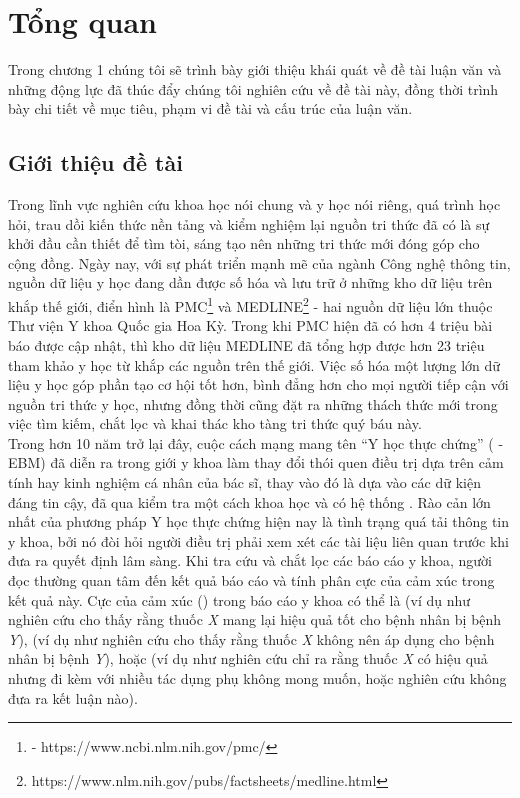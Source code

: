 \section{Tổng quan}
Trong chương 1 chúng tôi sẽ trình bày giới thiệu khái quát về đề tài luận văn và những động lực đã thúc đẩy chúng tôi nghiên cứu về đề tài này, đồng thời trình bày chi tiết về mục tiêu, phạm vi đề tài và cấu trúc của luận văn.
\subsection{Giới thiệu đề tài}
Trong lĩnh vực nghiên cứu khoa học nói chung và y học nói riêng, quá trình học hỏi, trau dồi kiến thức nền tảng và kiểm nghiệm lại nguồn tri thức đã có là sự khởi đầu cần thiết để tìm tòi, sáng tạo nên những tri thức mới đóng góp cho cộng đồng. Ngày nay, với sự phát triển mạnh mẽ của ngành Công nghệ thông tin, nguồn dữ liệu y học đang dần được số hóa và lưu trữ ở những kho dữ liệu trên khắp thế giới, điển hình là PMC\footnote{ - https://www.ncbi.nlm.nih.gov/pmc/} và MEDLINE\footnote{https://www.nlm.nih.gov/pubs/factsheets/medline.html} - hai nguồn dữ liệu lớn thuộc Thư viện Y khoa Quốc gia Hoa Kỳ. Trong khi PMC hiện đã có hơn 4 triệu bài báo được cập nhật, thì kho dữ liệu MEDLINE đã tổng hợp được hơn 23 triệu tham khảo y học từ khắp các nguồn trên thế giới. Việc số hóa một lượng lớn dữ liệu y học góp phần tạo cơ hội tốt hơn, bình đẳng hơn cho mọi người tiếp cận với nguồn tri thức y học, nhưng đồng thời cũng đặt ra những thách thức mới trong việc tìm kiếm, chắt lọc và khai thác kho tàng tri thức quý báu này.\\

Trong hơn 10 năm trở lại đây, cuộc cách mạng mang tên ``Y học thực chứng'' ( - EBM) đã diễn ra trong giới y khoa làm thay đổi thói quen điều trị dựa trên cảm tính hay kinh nghiệm cá nhân của bác sĩ, thay vào đó là dựa vào các dữ kiện đáng tin cậy, đã qua kiểm tra một cách khoa học và có hệ thống \cite{Nguyen2004}. Rào cản lớn nhất của phương pháp Y học thực chứng hiện nay là tình trạng quá tải thông tin y khoa, bởi nó đòi hỏi người điều trị phải xem xét các tài liệu liên quan trước khi đưa ra quyết định lâm sàng. Khi tra cứu và chắt lọc các báo cáo y khoa, người đọc thường quan tâm đến kết quả báo cáo và tính phân cực của cảm xúc trong kết quả này. Cực của cảm xúc () trong báo cáo y khoa có thể là \tichcuc (ví dụ như nghiên cứu cho thấy rằng thuốc \textit{X} mang lại hiệu quả tốt cho bệnh nhân bị bệnh \textit{Y}), \tieucuc (ví dụ như nghiên cứu cho thấy rằng thuốc \textit{X} không nên áp dụng cho bệnh nhân bị bệnh \textit{Y}), hoặc \trungtinh (ví dụ như nghiên cứu chỉ ra rằng thuốc \textit{X} có hiệu quả nhưng đi kèm với nhiều tác dụng phụ không mong muốn, hoặc nghiên cứu không đưa ra kết luận nào).\\

